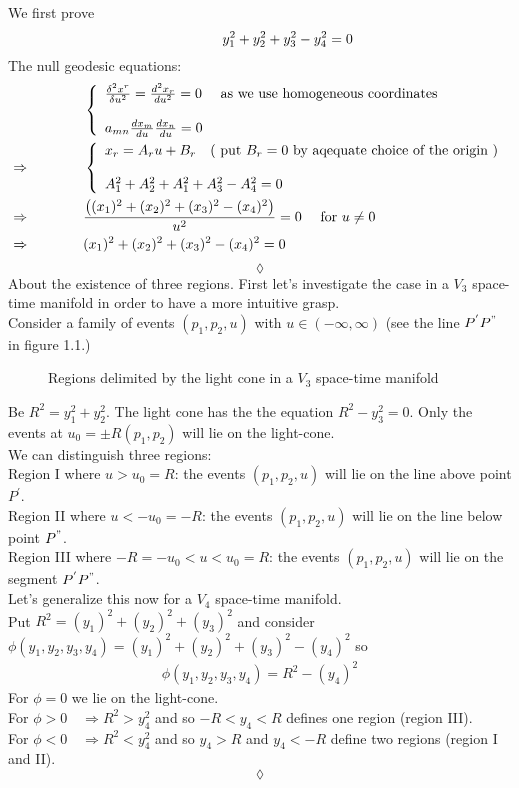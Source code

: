 We first prove 
$$\mathbf{\quad\quad\quad\quad} y^2_1+y^2_2+y^2_3-y^2_4=0$$
The null geodesic equations:
\begin{align*}
& \left\{ \begin{array}{l}
\frac{\delta^2 x^r}{\delta u^2} = \dv[2]{x_r}{u} =0 \quad \text{ as we use homogeneous coordinates}\\\\
a_{mn} \dv{x_m}{u}\dv{x_n}{u}=0\\
\end{array} \right.\\
\Rightarrow \quad\quad\quad\quad & \left\{ \begin{array}{l}
x_r = A_ru+B_r\quad \text{( put } B_r=0 \text{ by aqequate choice of the origin )} \\\\
A_1^2+A_2^2+A_1^2+A_3^2-A_4^2=0\\
\end{array} \right.\\
\Rightarrow \quad\quad\quad\quad &\frac{\left((x_1)^2+(x_2)^2+(x_3)^2-(x_4)^2\right)}{u^2} = 0\quad \text{ for } u\neq 0\\
\Rightarrow \quad\quad\quad\quad &(x_1)^2+(x_2)^2+(x_3)^2-(x_4)^2 = 0
\end{align*}
$$\lozenge$$
About the existence of three regions. First let's investigate the case in a $V_3$ space-time manifold in order to have a more intuitive grasp.\\
Consider a family of events $(p_1,p_2,u)$ with $u\in\left(-\infty,\infty\right)$ (see the line $P^{'}P^{"}$ in figure 1.1.)
\begin{figure}[H]

\caption{Regions delimited by the light cone in a $V_3$ space-time manifold}
\label{fig:fig_p96_3415_a}
\end{figure}
Be $R^2 = y_1^2 +y_2^2$. The light cone has the the equation $R^2- y_3^2=0$. Only the events at $ u_0 = \pm R(p_1,p_2)$ will lie on the light-cone.\\
We can distinguish three regions:\\
Region I where $u > u_0 = R$: the events $(p_1,p_2,u)$ will lie on the line above point $P^{'}$.\\
Region II where $ u < -u_0 = -R$: the events $(p_1,p_2,u)$ will lie on the line below point $P^{"}$.\\
Region III where $ -R= -u_0 < u < u_0 = R$: the events $(p_1,p_2,u)$ will lie on the segment $P^{'}P^{"}$.\\
Let's generalize this now for a $V_4$ space-time manifold.\\
Put $R^2 = (y_1)^2+(y_2)^2+(y_3)^2$ and consider $\phi(y_1,y_2,y_3,y_4)= (y_1)^2+(y_2)^2+(y_3)^2-(y_4)^2$ so \begin{align}\phi(y_1,y_2,y_3,y_4)= R^2-(y_4)^2\end{align}
For $\phi=0$ we lie on the light-cone.\\
For $\phi>0 \quad\Rightarrow R^2 > y_4^2$ and so $-R<y_4<R$ defines one region (region III).\\
For $\phi<0 \quad\Rightarrow R^2 < y_4^2$ and so   $y_4>R$ and $y_4<-R$ define two  regions (region I and II).
$$\lozenge$$

